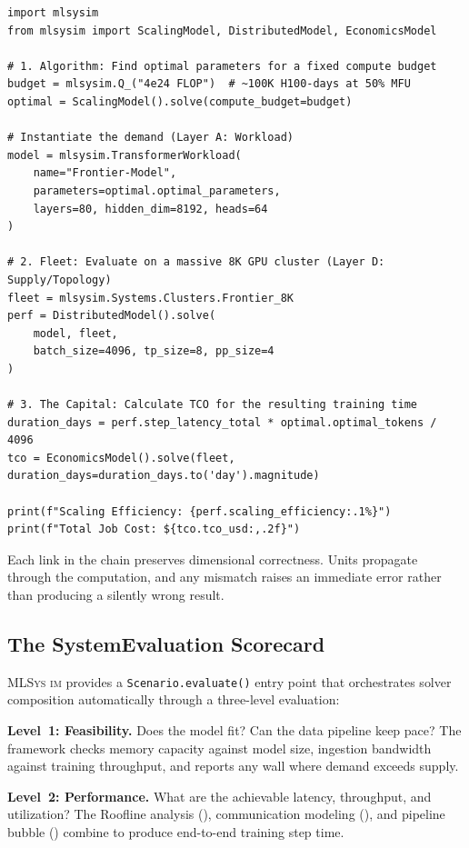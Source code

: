 \documentclass[10pt,twocolumn]{article}
\newcommand{\mlsysim}{\mbox{\textsc{MLSys}\,\textperiodcentered\,\textsc{im}}\xspace}
\begin{document}
\begin{lstlisting}[caption={\textbf{Solver Composition.} Bridging algorithmic scaling, distributed execution, and fleet economics in a single executable chain.},label={lst:composability},float=t]
import mlsysim
from mlsysim import ScalingModel, DistributedModel, EconomicsModel

# 1. Algorithm: Find optimal parameters for a fixed compute budget
budget = mlsysim.Q_("4e24 FLOP")  # ~100K H100-days at 50% MFU
optimal = ScalingModel().solve(compute_budget=budget)

# Instantiate the demand (Layer A: Workload)
model = mlsysim.TransformerWorkload(
    name="Frontier-Model",
    parameters=optimal.optimal_parameters,
    layers=80, hidden_dim=8192, heads=64
)

# 2. Fleet: Evaluate on a massive 8K GPU cluster (Layer D: Supply/Topology)
fleet = mlsysim.Systems.Clusters.Frontier_8K
perf = DistributedModel().solve(
    model, fleet, 
    batch_size=4096, tp_size=8, pp_size=4
)

# 3. The Capital: Calculate TCO for the resulting training time
duration_days = perf.step_latency_total * optimal.optimal_tokens / 4096
tco = EconomicsModel().solve(fleet, duration_days=duration_days.to('day').magnitude)

print(f"Scaling Efficiency: {perf.scaling_efficiency:.1%}")
print(f"Total Job Cost: ${tco.tco_usd:,.2f}")
\end{lstlisting}

Each link in the chain preserves dimensional correctness. Units propagate through the computation, and any mismatch raises an immediate error rather than producing a silently wrong result.

\subsection{The SystemEvaluation Scorecard}
\label{sec:solvers-scorecard}

\mlsysim provides a \texttt{Scenario.evaluate()} entry point that orchestrates solver composition automatically through a three-level evaluation:

\textbf{Level~1: Feasibility.} Does the model fit? Can the data pipeline keep pace? The framework checks memory capacity against model size, ingestion bandwidth against training throughput, and reports any wall where demand exceeds supply.

\textbf{Level~2: Performance.} What are the achievable latency, throughput, and utilization? The Roofline analysis (), communication modeling (), and pipeline bubble () combine to produce end-to-end training step time.
\end{document}
